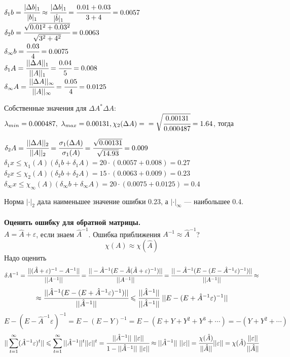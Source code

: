 \documentclass[12pt]{article}
\theoremstyle{definition}
\numberwithin{equation}{section}
\begin{document}
	\begin{center}
		$\delta_1 b=\cfrac{|\Delta b|_1}{|b|_1}\approx \cfrac{|\Delta b|_1}{|\hat b|_1}=\cfrac{0.01+0.03}{3+4}=0.0057$\\
		$\delta_2 b=\cfrac{\sqrt{0.01^2+0.03^2}}{\sqrt{3^2+4^2}}=0.0063$\\
		$\delta_{\infty}b=\cfrac{0.03}{4}=0.0075$\\
		$\delta_1 A=\cfrac{||\Delta A||_1}{||A||_1}=\cfrac{0.04}{5}=0.008$\\
		$\delta_{\infty} A =\cfrac{||\Delta A||_{\infty}}{||A||_{\infty}}=\cfrac{0.05}{4}=0.0125$
	\end{center}
	Собственные значения для $\Delta A^* \Delta A$: $\lambda_{min}=0.000487,~ \lambda_{max}=0.00131, \chi_2(\Delta A)=\\=\sqrt{\cfrac{0.00131}{0.000487}}=1.64$, тогда
	\begin{center}
		$\delta_2 A =\cfrac{||\Delta A||_2}{||A||_2}=\cfrac{\sigma_1(\Delta A)}{\sigma_1(A)}=\cfrac{\sqrt{0.00131}}{\sqrt{14.93}}=0.009$\\
		$\delta_1 x\leqslant \chi_1(A)(\delta_1 b+\delta_1 A) =20\cdot (0.0057+0.008)=0.27$\\
		$\delta_2 x\leqslant \chi_2(A)(\delta_2 b+\delta_2 A) =15\cdot (0.0063+0.009)=0.23$\\
		$\delta_{\infty} x\leqslant \chi_{\infty}(A)(\delta_{\infty} b+\delta_{\infty} A) =20\cdot (0.0075+0.0125)=0.4$
	\end{center}
	Норма $|\cdot|_2$ дала наименьшее значение ошибки 0.23, а $|\cdot|_{\infty}$ --- наибольшее 0.4.\\
	\\
	\textbf{Оценить ошибку для обратной матрицы.}\\
	$A=\hat A+\varepsilon$, если знаем $\hat A^{-1}$. Ошибка приближения $A^{-1}\approx \hat A^{-1}$?\\
	$$\chi(A)\approx \chi(\hat A)$$
	Надо оценить
	$$\delta A^{-1}=\cfrac{||(\hat A+\varepsilon)^{-1}-A^{-1}||}{||A^{-1}||}=\cfrac{||-\hat A^{-1}(E-\hat A(\hat A+\varepsilon)^{-1})||}{||A^{-1}||}=\cfrac{||-\hat A^{-1}(E-(E-\hat A^{-1}\varepsilon)^{-1})||}{||A^{-1}||}\approx$$ $$\approx \cfrac{||\hat A^{-1}(E-(E+\hat A^{-1}\varepsilon)^{-1})||}{||\hat A^{-1}||}\leqslant \cfrac{||\hat A^{-1}||}{||\hat A^{-1}||}~||E-(E+\hat A^{-1}\varepsilon)^{-1}||$$
	$$E-(E-\hat A^{-1} \varepsilon)^{-1}=E-(E-Y)^{-1}=E-(E+Y+Y^2+Y^3+\cdots)=-(Y+Y^2+\cdots)$$
	$$||\sum\limits_{t=1}^{\infty}(\hat A^{-1}\varepsilon)^t||\leqslant\sum\limits_{t=1}^{\infty}||\hat A^{-1}||^t||\varepsilon||^t=\cfrac{||\hat A^{-1}||~||\varepsilon||}{1-||\hat A^{-1}||~||\varepsilon||}\approx||\hat A^{-1}||~||\varepsilon||=\cfrac{\chi(\hat A)}{||\hat A||}||\varepsilon||=\chi(\hat A)\cfrac{||\varepsilon||}{||\hat A||}$$
\end{document}
